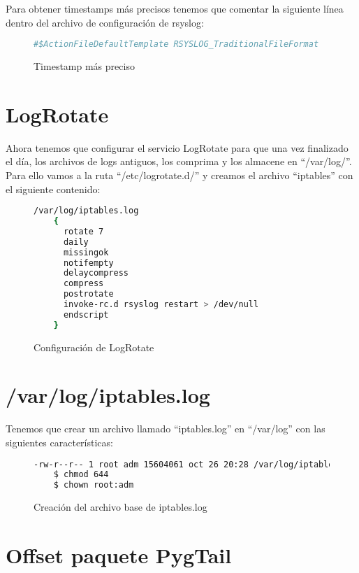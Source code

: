 Para obtener timestamps más precisos tenemos que comentar la siguiente línea dentro del archivo de configuración de rsyslog:

\begin{figure}[H]
  \begin{lstlisting}[language=bash]
    #$ActionFileDefaultTemplate RSYSLOG_TraditionalFileFormat
  \end{lstlisting}
  \caption{Timestamp más preciso}
\end{figure}

\section{LogRotate}

Ahora tenemos que configurar el servicio LogRotate para que una vez finalizado el día, los archivos de logs antiguos, los comprima y los almacene en ``/var/log/''. Para ello vamos a la ruta ``/etc/logrotate.d/'' y creamos el archivo ``iptables'' con el siguiente contenido:

\begin{figure}[H]
  \begin{lstlisting}[language=bash]
    /var/log/iptables.log
    {
      rotate 7
      daily
      missingok
      notifempty
      delaycompress
      compress
      postrotate
      invoke-rc.d rsyslog restart > /dev/null
      endscript
    }
  \end{lstlisting}
  \caption{Configuración de LogRotate}
\end{figure}

\section{/var/log/iptables.log}

Tenemos que crear un archivo llamado ``iptables.log'' en ``/var/log'' con las siguientes características:

\begin{figure}[H]
  \begin{lstlisting}[language=bash]
    -rw-r--r-- 1 root adm 15604061 oct 26 20:28 /var/log/iptables.log
    $ chmod 644
    $ chown root:adm
  \end{lstlisting}
  \caption{Creación del archivo base de iptables.log}
\end{figure}

\section{Offset paquete PygTail}

